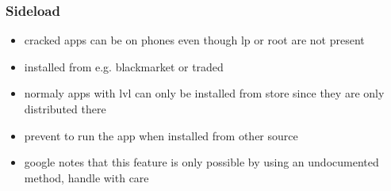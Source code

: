 \subsubsection{Sideload} \label{subsection:counter-improve-tampering-sideload}
\begin{itemize}
  \item cracked apps can be on phones even though lp or root are not present
  \item installed from e.g. blackmarket or traded
  \item normaly apps with lvl can only be installed from store since they are only distributed there
  \item prevent to run the app when installed from other source
  \item google notes that this feature is only possible by using an undocumented method, handle with care
\end{itemize}

